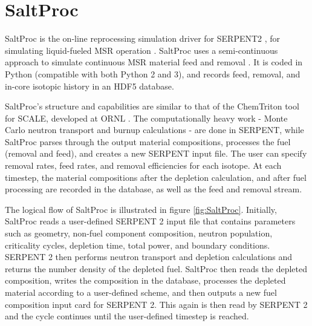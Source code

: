 \section{SaltProc}
\label{sec:saltproc}

SaltProc is the on-line reprocessing simulation
driver for SERPENT2 \cite{leppanen_serpent_2015},
for simulating liquid-fueled \gls{MSR} operation \cite{rykhlevskii_arfc/saltproc:_2018}.
SaltProc uses a semi-continuous approach to simulate
continuous \gls{MSR} material feed and removal \cite{rykhlevskii_online_2017}.
It is coded in Python (compatible with both Python 2 and 3), and
records feed, removal, and in-core isotopic history in an HDF5 \cite{the_hdf_group_hierarchical_1997} database.

SaltProc's structure and capabilities are similar to that of the
ChemTriton tool for SCALE, developed at ORNL \cite{betzler_molten_2017}.
The computationally heavy work - Monte Carlo neutron transport and
burnup calculations - are done in SERPENT, while SaltProc parses through
the output material compositions, processes the fuel (removal and feed),
and creates a new SERPENT input file. The user can specify removal
rates, feed rates, and removal efficiencies for each isotope. At each
timestep, the material compositions after the
depletion calculation, and after fuel processing are recorded in the
database, as well as the feed and removal stream.

The logical flow of SaltProc is illustrated in figure \ref{fig:SaltProc}.
Initially, SaltProc reads a user-defined SERPENT 2 input file that
contains parameters such as  geometry, non-fuel component composition,
neutron population, criticality cycles, depletion time, total power, and boundary conditions.
SERPENT 2 then performs neutron transport and depletion calculations and 
returns the number density of the depleted fuel. SaltProc then reads the
depleted composition, writes the composition in the database, processes
the depleted material according to a user-defined scheme, and then
outputs a new fuel composition input card for SERPENT 2. This again
is then read by SERPENT 2 and the cycle continues until the user-defined
timestep is reached.

